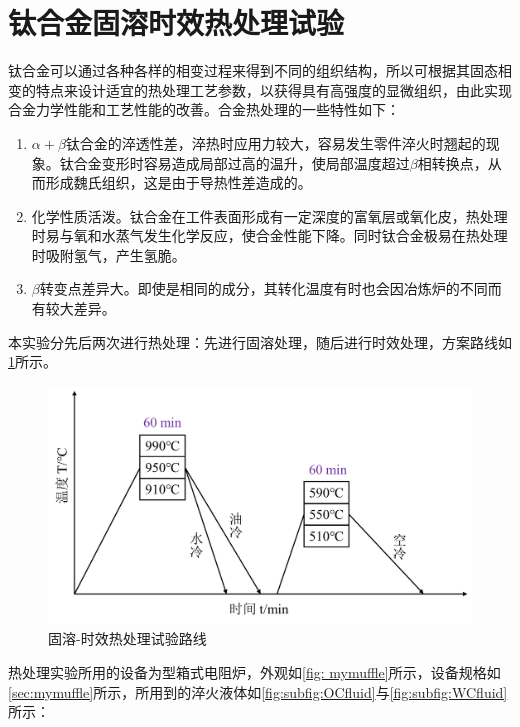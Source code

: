 \section{钛合金固溶时效热处理试验}

钛合金可以通过各种各样的相变过程来得到不同的组织结构，所以可根据其固态相变的特点来设计适宜的热处理工艺参数，以获得具有高强度的显微组织，由此实现\ti 合金力学性能和工艺性能的改善。\ti 合金热处理的一些特性如下：
\begin{enumerate}
	\item $\alpha+\beta$钛合金的淬透性差，淬热时应用力较大，容易发生零件淬火时翘起的现象。钛合金变形时容易造成局部过高的温升，使局部温度超过$\beta$相转换点，从而形成魏氏组织，这是由于导热性差造成的。
	\item 化学性质活泼。钛合金在工件表面形成有一定深度的富氧层或氧化皮，热处理时易与氧和水蒸气发生化学反应，使合金性能下降。同时钛合金极易在热处理时吸附氢气，产生氢脆。
	\item $\beta$转变点差异大。即使是相同的成分，其转化温度有时也会因冶炼炉的不同而有较大差异。
\end{enumerate}

本实验分先后两次进行热处理：先进行固溶处理，随后进行时效处理，方案路线如\ref{fig: heatway}所示。
\begin{figure}[h!]
	\centering
	\includegraphics[width=0.7\linewidth]{pic/处理路线}
	\caption{固溶-时效热处理试验路线}
	\label{fig: heatway}
\end{figure}

热处理实验所用的设备为型箱式电阻炉，外观如\ref{fig: mymuffle}所示，设备规格如\ref{sec:mymuffle}所示，所用到的淬火液体如\ref{fig:subfig:OCfluid}与\ref{fig:subfig:WCfluid}所示：


